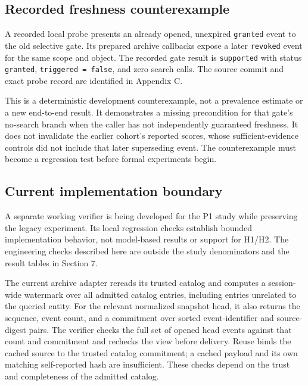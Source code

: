 \subsection{Recorded freshness
counterexample}\label{recorded-freshness-counterexample}

A recorded local probe presents an already opened, unexpired
\texttt{granted} event to the old selective gate. Its prepared archive
callbacks expose a later \texttt{revoked} event for the same scope and
object. The recorded gate result is \texttt{supported} with status
\texttt{granted}, \texttt{triggered\ =\ false}, and zero search calls.
The source commit and exact probe record are identified in Appendix C.

This is a deterministic development counterexample, not a prevalence
estimate or a new end-to-end result. It demonstrates a missing
precondition for that gate's no-search branch when the caller has not
independently guaranteed freshness. It does not invalidate the earlier
cohort's reported scores, whose sufficient-evidence controls did not
include that later superseding event. The counterexample must become a
regression test before formal experiments begin.

\subsection{Current implementation
boundary}\label{current-implementation-boundary}

A separate working verifier is being developed for the P1 study while
preserving the legacy experiment. Its local regression checks establish
bounded implementation behavior, not model-based results or support for
H1/H2. The engineering checks described here are outside the study
denominators and the result tables in Section 7.

The current archive adapter rereads its trusted catalog and computes a
session-wide watermark over all admitted catalog entries, including
entries unrelated to the queried entity. For the relevant normalized
snapshot head, it also returns the sequence, event count, and a
commitment over sorted event-identifier and source-digest pairs. The
verifier checks the full set of opened head events against that count
and commitment and rechecks the view before delivery. Reuse binds the
cached source to the trusted catalog commitment; a cached payload and
its own matching self-reported hash are insufficient. These checks
depend on the trust and completeness of the admitted catalog.

